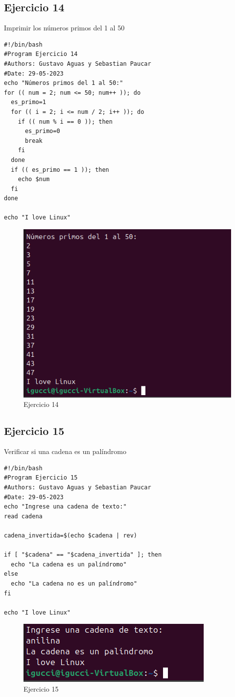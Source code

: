 \documentclass[11pt,twoside]{book}
\begin{document}
\subsection{Ejercicio 14}
Imprimir los números primos del 1 al 50
\begin{lstlisting}
#!/bin/bash
#Program Ejercicio 14
#Authors: Gustavo Aguas y Sebastian Paucar
#Date: 29-05-2023
echo "Números primos del 1 al 50:"
for (( num = 2; num <= 50; num++ )); do
  es_primo=1
  for (( i = 2; i <= num / 2; i++ )); do
    if (( num % i == 0 )); then
      es_primo=0
      break
    fi
  done
  if (( es_primo == 1 )); then
    echo $num
  fi
done

echo "I love Linux"

\end{lstlisting}
\begin{figure}[h]
    \centering
    \includegraphics[width=0.5\linewidth]{Ej14.png}
    \caption{Ejercicio 14}
\end{figure}
\newpage
\subsection{Ejercicio 15}
Verificar si una cadena es un palíndromo
\begin{lstlisting}
#!/bin/bash
#Program Ejercicio 15
#Authors: Gustavo Aguas y Sebastian Paucar
#Date: 29-05-2023
echo "Ingrese una cadena de texto:"
read cadena

cadena_invertida=$(echo $cadena | rev)

if [ "$cadena" == "$cadena_invertida" ]; then
  echo "La cadena es un palíndromo"
else
  echo "La cadena no es un palíndromo"
fi

echo "I love Linux"

\end{lstlisting}
\begin{figure}[h]
    \centering
    \includegraphics[width=0.5\linewidth]{Ej15.png}
    \caption{Ejercicio 15}
\end{figure}
\newpage
\end{document}
